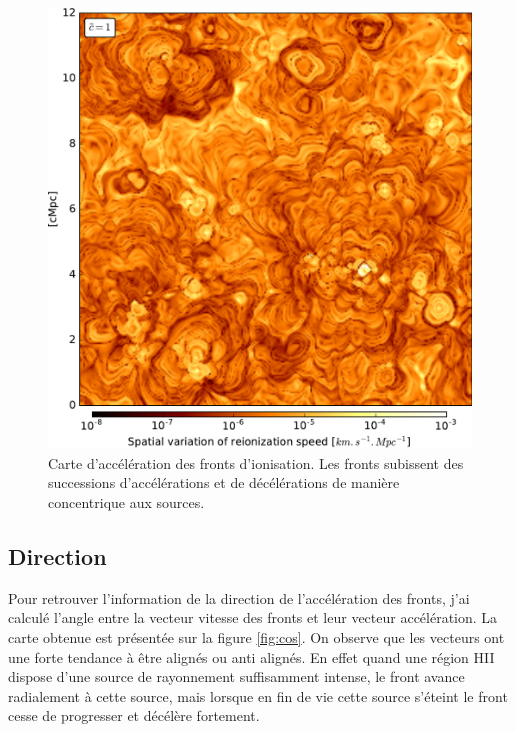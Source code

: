 \begin{figure}
        \includegraphics[width=.95\linewidth]{img/04_mapreio/map_acc_c1.pdf} 
        \caption[Direction de l'accélération]{Carte d'accélération des fronts d'ionisation.
		Les fronts subissent des successions d'accélérations et de décélérations de manière concentrique aux sources.
        }
 		\label{fig:accz}
\end{figure}


\subsection{Direction} 


Pour retrouver l'information de la direction de l'accélération des fronts, j'ai calculé l'angle entre la vecteur vitesse des fronts et leur vecteur accélération.
La carte obtenue est présentée sur la figure \ref{fig:cos}.
On observe que les vecteurs ont une forte tendance à être alignés ou anti alignés.
En effet quand une région HII dispose d'une source de rayonnement suffisamment intense, le front avance radialement à cette source, mais lorsque  en fin de vie cette source s'éteint le front cesse de progresser et décélère fortement.

